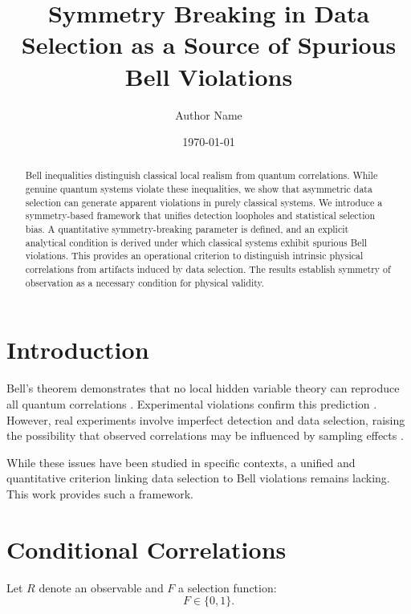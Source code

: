 \documentclass[aps,prl,onecolumn,superscriptaddress]{revtex4-2}
\begin{document}
\title{Symmetry Breaking in Data Selection as a Source of Spurious Bell Violations}

\author{Author Name}

\date{\today}

\begin{abstract}
Bell inequalities distinguish classical local realism from quantum correlations. While genuine quantum systems violate these inequalities, we show that asymmetric data selection can generate apparent violations in purely classical systems. We introduce a symmetry-based framework that unifies detection loopholes and statistical selection bias. A quantitative symmetry-breaking parameter is defined, and an explicit analytical condition is derived under which classical systems exhibit spurious Bell violations. This provides an operational criterion to distinguish intrinsic physical correlations from artifacts induced by data selection. The results establish symmetry of observation as a necessary condition for physical validity.
\end{abstract}

\maketitle

\section{Introduction}

Bell's theorem demonstrates that no local hidden variable theory can reproduce all quantum correlations \cite{bell1964}. Experimental violations confirm this prediction \cite{aspect1982}. However, real experiments involve imperfect detection and data selection, raising the possibility that observed correlations may be influenced by sampling effects \cite{pearle1970,garg1987}.

While these issues have been studied in specific contexts, a unified and quantitative criterion linking data selection to Bell violations remains lacking. This work provides such a framework.

\section{Conditional Correlations}

Let $R$ denote an observable and $F$ a selection function:
\[
F \in \{0,1\}.
\]
\end{document}
